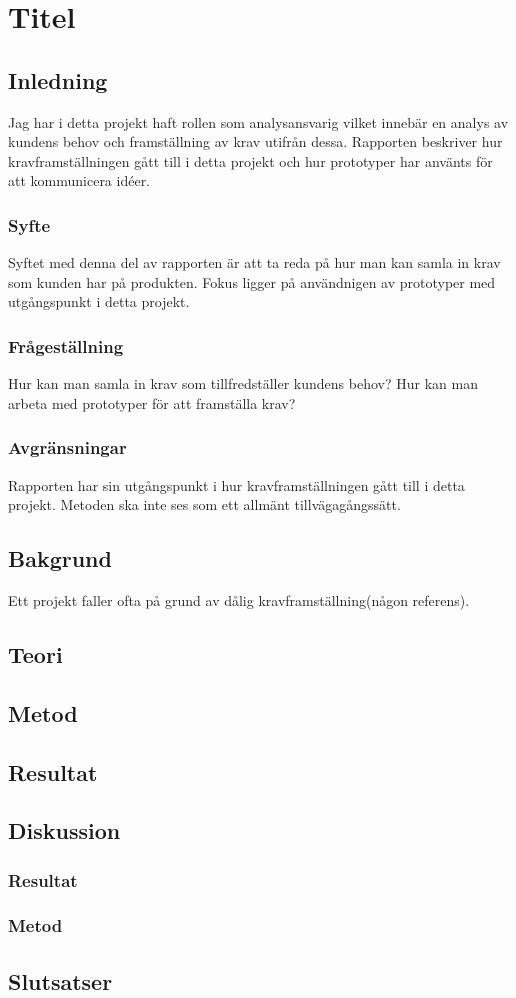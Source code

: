 \section{Titel}
\subsection{Inledning}
Jag har i detta projekt haft rollen som analysansvarig vilket innebär en analys av kundens behov och framställning av krav utifrån dessa. Rapporten beskriver hur kravframställningen gått till i detta projekt och hur prototyper har använts för att kommunicera idéer.
\subsubsection{Syfte}
Syftet med denna del av rapporten är att ta reda på hur man kan samla in krav som kunden har på produkten. Fokus ligger på användnigen av prototyper med utgångspunkt i detta projekt.
\subsubsection{Frågeställning}
Hur kan man samla in krav som tillfredställer kundens behov?
Hur kan man arbeta med prototyper för att framställa krav?

\subsubsection{Avgränsningar}
Rapporten har sin utgångspunkt i hur kravframställningen gått till i detta projekt. Metoden ska inte ses som ett allmänt tillvägagångssätt.
\subsection{Bakgrund}
Ett projekt faller ofta på grund av dålig kravframställning(någon referens). 
\subsection{Teori}
\subsection{Metod}
\subsection{Resultat}
\subsection{Diskussion}
\subsubsection{Resultat}
\subsubsection{Metod}
\subsection{Slutsatser}
